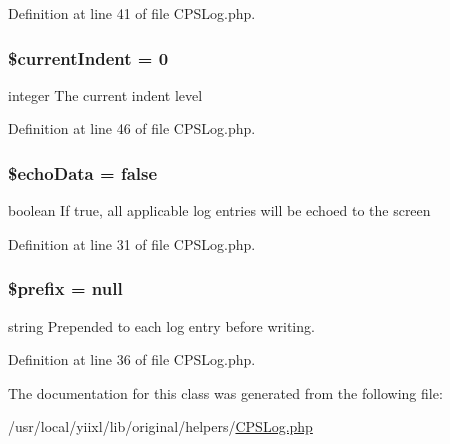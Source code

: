 Definition at line 41 of file CPSLog.php.

\hypertarget{classCPSLog_ac08dfa5d5e776a071386c5aab064d0b2}{
\subsubsection[{\$currentIndent}]{\setlength{\rightskip}{0pt plus 5cm}\$currentIndent = 0}}
\label{classCPSLog_ac08dfa5d5e776a071386c5aab064d0b2}
integer The current indent level 

Definition at line 46 of file CPSLog.php.

\hypertarget{classCPSLog_aba01bbea42407ae9944e5b1247efeab2}{
\subsubsection[{\$echoData}]{\setlength{\rightskip}{0pt plus 5cm}\$echoData = false}}
\label{classCPSLog_aba01bbea42407ae9944e5b1247efeab2}
boolean If true, all applicable log entries will be echoed to the screen 

Definition at line 31 of file CPSLog.php.

\hypertarget{classCPSLog_a09e8cf95b9d29955a0bfabca9b420edc}{
\subsubsection[{\$prefix}]{\setlength{\rightskip}{0pt plus 5cm}\$prefix = null}}
\label{classCPSLog_a09e8cf95b9d29955a0bfabca9b420edc}
string Prepended to each log entry before writing. 

Definition at line 36 of file CPSLog.php.



The documentation for this class was generated from the following file:\begin{DoxyCompactItemize}
\item 
/usr/local/yiixl/lib/original/helpers/\hyperlink{CPSLog_8php}{CPSLog.php}\end{DoxyCompactItemize}
